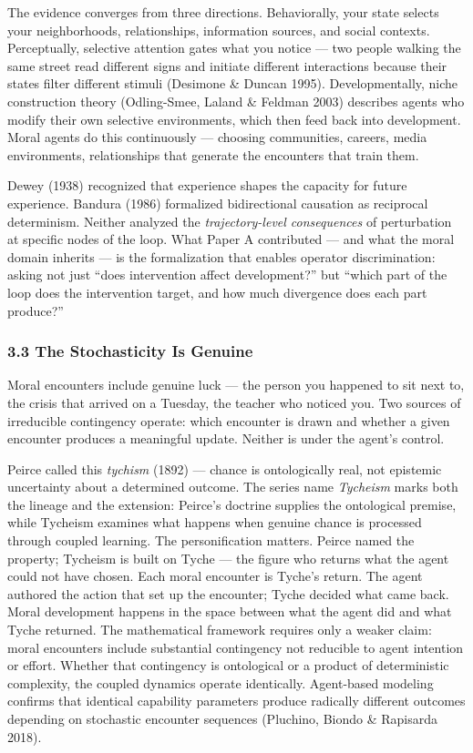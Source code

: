 \documentclass[
]{article}
\begin{document}
The evidence converges from three directions. Behaviorally, your state
selects your neighborhoods, relationships, information sources, and
social contexts. Perceptually, selective attention gates what you notice
--- two people walking the same street read different signs and initiate
different interactions because their states filter different stimuli
(Desimone \& Duncan 1995). Developmentally, niche construction theory
(Odling-Smee, Laland \& Feldman 2003) describes agents who modify their
own selective environments, which then feed back into development. Moral
agents do this continuously --- choosing communities, careers, media
environments, relationships that generate the encounters that train
them.

Dewey (1938) recognized that experience shapes the capacity for future
experience. Bandura (1986) formalized bidirectional causation as
reciprocal determinism. Neither analyzed the \emph{trajectory-level
consequences} of perturbation at specific nodes of the loop. What Paper
A contributed --- and what the moral domain inherits --- is the
formalization that enables operator discrimination: asking not just
``does intervention affect development?'' but ``which part of the loop
does the intervention target, and how much divergence does each part
produce?''

\subsubsection{3.3 The Stochasticity Is
Genuine}\label{the-stochasticity-is-genuine}

Moral encounters include genuine luck --- the person you happened to sit
next to, the crisis that arrived on a Tuesday, the teacher who noticed
you. Two sources of irreducible contingency operate: which encounter is
drawn and whether a given encounter produces a meaningful update.
Neither is under the agent's control.

Peirce called this \emph{tychism} (1892) --- chance is ontologically
real, not epistemic uncertainty about a determined outcome. The series
name \emph{Tycheism} marks both the lineage and the extension: Peirce's
doctrine supplies the ontological premise, while Tycheism examines what
happens when genuine chance is processed through coupled learning. The
personification matters. Peirce named the property; Tycheism is built on
Tyche --- the figure who returns what the agent could not have chosen.
Each moral encounter is Tyche's return. The agent authored the action
that set up the encounter; Tyche decided what came back. Moral
development happens in the space between what the agent did and what
Tyche returned. The mathematical framework requires only a weaker claim:
moral encounters include substantial contingency not reducible to agent
intention or effort. Whether that contingency is ontological or a
product of deterministic complexity, the coupled dynamics operate
identically. Agent-based modeling confirms that identical capability
parameters produce radically different outcomes depending on stochastic
encounter sequences (Pluchino, Biondo \& Rapisarda 2018).
\end{document}
